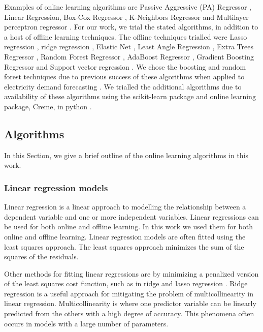 \documentclass[final,3p,times,twocolumn,numbers]{elsarticle}
\begin{document}
Examples of online learning algorithms are Passive Aggressive (PA) Regressor \cite{Gzik2014}, Linear Regression, Box-Cox Regressor \cite{Box1964}, K-Neighbors Regressor \cite{forgy65} and Multilayer perceptron regressor \cite{Hinton1989}. For our work, we trial the stated algorithms, in addition to a host of offline learning techniques. The offline techniques trialled were Lasso regression \cite{Tibshirani1996a}, ridge regression \cite{GeladiPaul1994Mrac},  Elastic Net \cite{Geostatistics2010}, Least Angle Regression \cite{Fike1988}, Extra Trees Regressor \cite{Fike1988}, Random Forest Regressor \cite{Breiman2001}, AdaBoost Regressor \cite{Freund1997}, Gradient Boosting Regressor \cite{316} and Support vector regression \cite{Cortes1995}. We chose the boosting and random forest techniques due to previous success of these algorithms when applied to electricity demand forecasting \cite{Kell2018}. We trialled the additional algorithms due to availability of these algorithms using the scikit-learn package and online learning package, Creme, in python \cite{scikit-learn,creme}. %


\subsection{Algorithms}

In this Section, we give a brief outline of the online learning algorithms in this work.


\subsubsection{Linear regression models}


Linear regression is a linear approach to modelling the relationship between a dependent variable and one or more independent variables. Linear regressions can be used for both online and offline learning. In this work we used them for both online and offline learning. Linear regression models are often fitted using the least squares approach. The least squares approach minimizes the sum of the squares of the residuals. 

Other methods for fitting linear regressions are by minimizing a penalized version of the least squares cost function, such as in ridge and lasso regression \cite{GeladiPaul1994Mrac, Tibshirani1996a}. Ridge regression is a useful approach for mitigating the problem of multicollinearity in linear regression. Multicollinearity is where one predictor variable can be linearly predicted from the others with a high degree of accuracy. This phenomena often occurs in models with a large number of parameters. 
\end{document}
